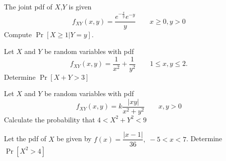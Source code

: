 \documentclass[../main.tex]{subfiles}
\begin{document}
\begin{example}
	The joint pdf of $X$,$Y$ is given
	$$f_{XY}(x,y) = \dfrac{e^{-\frac{x}{y}}e^{-y}}{y}\qquad x\geq 0, y>0$$
	Compute $\Pr[X \geq 1 | Y=y]$.
\end{example}

\begin{example}
	Let $X$ and $Y$ be random variables with pdf $$f_{XY}(x,y) = \dfrac{1}{x^2} + 
	\dfrac{1}{y^2} \qquad 1\leq x,y \leq 2. $$ Determine $\Pr[X+Y>3]$
\end{example}
\begin{example}
	Let $X$ and $Y$ be random variables with pdf 
	$$f_{XY}(x,y) = k \dfrac{|xy|}{x^2+y^2} \qquad x,y > 0$$ Calculate the probability
	that $4 < X^2+Y^2 < 9$
\end{example}

\begin{example}
	Let the pdf of $X$ be given by $f(x) = \dfrac{|x-1|}{36},\;-5<x<7$. Determine
	$\Pr[X^2 > 4]$
\end{example}
\end{document}
